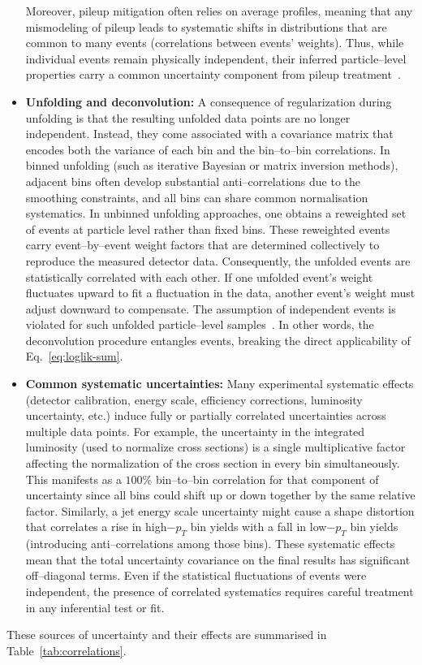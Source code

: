 \begin{itemize}
        Moreover, pileup mitigation often relies on average profiles, meaning that any mismodeling of pileup leads to systematic shifts in distributions that are common to many events (correlations between events’ weights).
        Thus, while individual events remain physically independent, their inferred particle--level properties carry a common uncertainty component from pileup treatment~.
        \item \textbf{Unfolding and deconvolution:}
        A consequence of regularization during unfolding is that the resulting unfolded data points are no longer independent.
        Instead, they come associated with a covariance matrix that encodes both the variance of each bin and the bin--to--bin correlations.
        In binned unfolding (such as iterative Bayesian or matrix inversion methods), adjacent bins often develop substantial anti--correlations due to the smoothing constraints, and all bins can share common normalisation systematics.
        In unbinned unfolding approaches, one obtains a reweighted set of events at particle level rather than fixed bins.
        These reweighted events carry event--by--event weight factors that are determined collectively to reproduce the measured detector data.
        Consequently, the unfolded events are statistically correlated with each other.
        If one unfolded event’s weight fluctuates upward to fit a fluctuation in the data, another event’s weight must adjust downward to compensate.
        The assumption of independent events is violated for such unfolded particle--level samples~.
        In other words, the deconvolution procedure entangles events, breaking the direct applicability of Eq.~\ref{eq:loglik-sum}.
        \item \textbf{Common systematic uncertainties:}
        Many experimental systematic effects (detector calibration, energy scale, efficiency corrections, luminosity uncertainty, etc.) induce fully or partially correlated uncertainties across multiple data points.
        For example, the uncertainty in the integrated luminosity (used to normalize cross sections) is a single multiplicative factor affecting the normalization of the cross section in every bin simultaneously.
        This manifests as a $100\%$ bin--to--bin correlation for that component of uncertainty since all bins could shift up or down together by the same relative factor.
        Similarly, a jet energy scale uncertainty might cause a shape distortion that correlates a rise in high$-p_T$ bin yields with a fall in low$-p_T$ bin yields (introducing anti--correlations among those bins).
        These systematic effects mean that the total uncertainty covariance on the final results has significant off--diagonal terms.
        Even if the statistical fluctuations of events were independent, the presence of correlated systematics requires careful treatment in any inferential test or fit.
    \end{itemize}
    These sources of uncertainty and their effects are summarised in Table~\ref{tab:correlations}.
    
